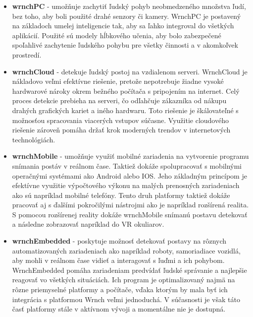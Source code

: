 \documentclass[slovak,master,dept460,male,cpp,cpdeclaration]{diploma}
\begin{document}
\begin{itemize}
\item \textbf{wrnchPC} - umožňuje zachytiť ľudský pohyb neobmedzeného množstva ľudí, bez toho, aby boli použité drahé senzory či kamery. WrnchPC je postavený na základoch  umelej inteligencie tak, aby sa ľahko integroval do všetkých aplikácií. Použité sú modely hĺbkového učenia, aby bolo zabezpečené spoľahlivé zachytenie ľudského pohybu pre všetky činnosti a v akomkoľvek prostredí.

\item \textbf{wrnchCloud} - detekuje ľudský postoj na vzdialenom serveri. WrnchCloud je nákladovo veľmi efektívne riešenie, pretože nepotrebuje žiadne vysoké hardwarové nároky okrem bežného počítača s pripojením na internet. Celý proces detekcie prebieha na serveri, čo odľahčuje zákazníka od nákupu drahých grafických kariet a iného hardwaru. Toto riešenie je škálovateľné s možnosťou spracovania viacerých vstupov súčasne. Využitie cloudového riešenie zároveň pomáha držať krok moderných trendov v internetových technológiách.

\item \textbf{wrnchMobile } - umožňuje využiť mobilné zariadenia na vytvorenie programu snímania postáv v reálnom čase. Taktiež dokáže spolupracovať s mobilnými operačnými systémami ako Android alebo IOS. Jeho základným princípom je efektívne využitie výpočtového výkonu  na malých prenosných zariadeniach ako sú napríklad mobilné telefóny. Tento druh platformy taktiež dokáže pracovať aj s ďalšími pokročilými nástrojmi ako je napríklad rozšírená realita. S pomocou rozšírenej reality dokáže wrnchMobile snímanú postavu detekovať a následne zobrazovať napríklad do VR okuliarov.

\item \textbf{wrnchEmbedded} - poskytuje možnosť detekovať postavy na rôznych automatizovaných zariadeniach ako napríklad roboty, samoriadiace vozidlá, aby mohli v reálnom čase vidieť a interagovať s ľuďmi a ich pohybom. WrnchEmbedded pomáha zariadeniam predvídať ľudské správanie a najlepšie reagovať vo všetkých situáciách. Ich program je optimalizovaný najmä na rôzne priemyselné platformy a počítače, vďaka ktorým by mala byť ich integrácia s platformou Wrnch veľmi jednoduchá. V súčasnosti je však táto časť platformy stále v aktívnom vývoji a momentálne nie je dostupná. 
\end{itemize}
\end{document}
